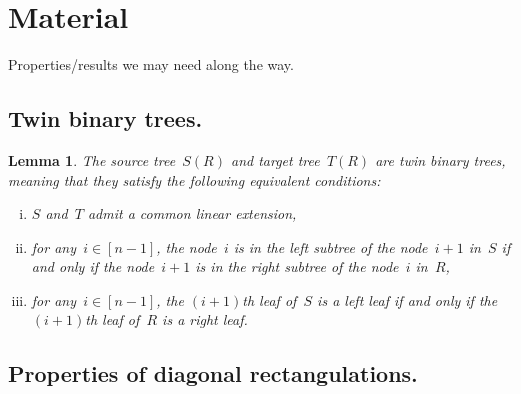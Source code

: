 \documentclass{amsart}
\newtheorem{lemma}[theorem]{Lemma}
\theoremstyle{definition}
\newcommand{\darkblue}{\color{darkblue}} %
\newcommand{\defn}[1]{\textsl{\darkblue #1}} %
\begin{document}

{}


\label{sec:biblio}


\newpage
\appendix
\section{Material}

Properties/results we may need along the way.


\subsection{Twin binary trees.}

\begin{lemma}
The source tree~$S(R)$ and target tree~$T(R)$ are \defn{twin binary trees}, meaning that they satisfy the following equivalent conditions:
\begin{enumerate}[(i)]
\item $S$ and~$T$ admit a common linear extension,
\item for any~$i \in [n-1]$, the node~$i$ is in the left subtree of the node~$i+1$ in~$S$ if and only if the node~$i+1$ is in the right subtree of the node~$i$ in~$R$,
\item for any~$i \in [n-1]$, the $(i+1)$th leaf of~$S$ is a left leaf if and only if the $(i+1)$th leaf of~$R$ is a right leaf.
\end{enumerate}
\end{lemma}


\subsection{Properties of diagonal rectangulations.}
\end{document}
